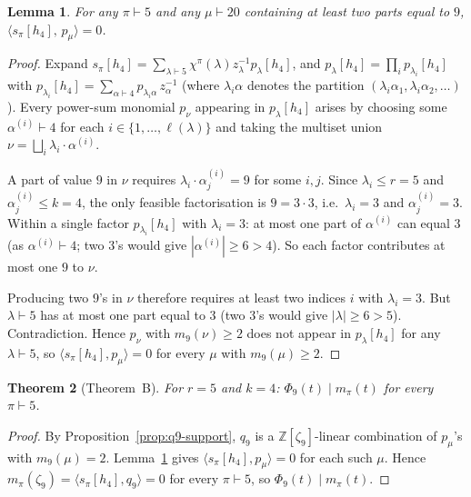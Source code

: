 \documentclass[11pt]{article}
\newtheorem{theorem}{Theorem}
\newtheorem{lemma}[theorem]{Lemma}
\theoremstyle{plain}
\theoremstyle{definition}
\theoremstyle{remark}
\newcommand{\ZZ}{\mathbb{Z}}
\begin{document}
\begin{lemma}\label{lem:no-two-nines}
For any $\pi \vdash 5$ and any $\mu \vdash 20$ containing at least two parts equal to $9$,
$\langle s_\pi[h_4],\, p_\mu\rangle = 0$.
\end{lemma}

\begin{proof}
Expand $s_\pi[h_4] = \sum_{\lambda \vdash 5} \chi^\pi(\lambda) z_\lambda^{-1} p_\lambda[h_4]$, and
$p_\lambda[h_4] = \prod_i p_{\lambda_i}[h_4]$ with
$p_{\lambda_i}[h_4] = \sum_{\alpha \vdash 4} p_{\lambda_i \alpha}\, z_\alpha^{-1}$
(where $\lambda_i \alpha$ denotes the partition $(\lambda_i \alpha_1, \lambda_i \alpha_2, \ldots)$).
Every power-sum monomial $p_\nu$ appearing in $p_\lambda[h_4]$ arises by choosing
some $\alpha^{(i)} \vdash 4$ for each $i \in \{1, \ldots, \ell(\lambda)\}$ and taking
the multiset union $\nu = \bigsqcup_i \lambda_i \cdot \alpha^{(i)}$.

A part of value $9$ in $\nu$ requires $\lambda_i \cdot \alpha^{(i)}_j = 9$ for some $i, j$.
Since $\lambda_i \le r = 5$ and $\alpha^{(i)}_j \le k = 4$, the only feasible
factorisation is $9 = 3 \cdot 3$, i.e.\ $\lambda_i = 3$ and $\alpha^{(i)}_j = 3$.
Within a single factor $p_{\lambda_i}[h_4]$ with $\lambda_i = 3$: at most one part of $\alpha^{(i)}$
can equal $3$ (as $\alpha^{(i)} \vdash 4$; two $3$'s would give $|\alpha^{(i)}| \ge 6 > 4$).
So each factor contributes at most one $9$ to $\nu$.

Producing two $9$'s in $\nu$ therefore requires at least two indices $i$ with $\lambda_i = 3$.
But $\lambda \vdash 5$ has at most one part equal to $3$ (two $3$'s would give $|\lambda| \ge 6 > 5$).
Contradiction.  Hence $p_\nu$ with $m_9(\nu) \ge 2$ does not appear in $p_\lambda[h_4]$ for
any $\lambda \vdash 5$, so $\langle s_\pi[h_4], p_\mu\rangle = 0$ for every $\mu$ with $m_9(\mu) \ge 2$.
\end{proof}

\begin{theorem}[Theorem~B]\label{thm:B}
For $r = 5$ and $k = 4$: $\Phi_9(t) \mid m_\pi(t)$ for every $\pi \vdash 5$.
\end{theorem}

\begin{proof}
By Proposition~\ref{prop:q9-support}, $q_9$ is a $\ZZ[\zeta_9]$-linear combination of $p_\mu$'s
with $m_9(\mu) = 2$.  Lemma~\ref{lem:no-two-nines} gives $\langle s_\pi[h_4], p_\mu\rangle = 0$
for each such $\mu$.  Hence
$m_\pi(\zeta_9) = \langle s_\pi[h_4], q_9\rangle = 0$ for every $\pi \vdash 5$,
so $\Phi_9(t) \mid m_\pi(t)$.
\end{proof}
\end{document}
